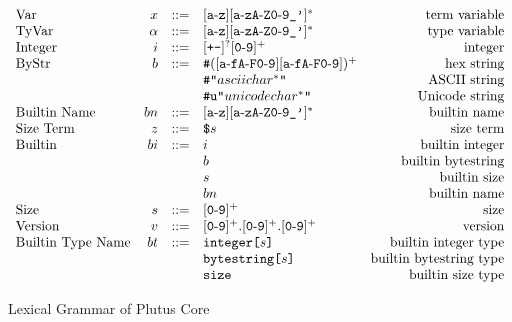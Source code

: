 \documentclass[../main.tex]{subfiles}
\begin{document}
\begin{figure*}[t]
    \centering
    \[\begin{array}{lrclr}
        \textrm{Var}     & x  & ::= & [\texttt{a}\!\hyphen{}\!\texttt{z}][\texttt{a}\!\hyphen{}\!\texttt{zA}\!\hyphen{}\!\texttt{Z0}\!\hyphen{}\!\texttt{9\_'}]^*                                                           & \textrm{term variable}\\
        \textrm{TyVar}   & \alpha & ::= & [\texttt{a}\!\hyphen{}\!\texttt{z}][\texttt{a}\!\hyphen{}\!\texttt{zA}\!\hyphen{}\!\texttt{Z0}\!\hyphen{}\!\texttt{9\_'}]^*                                                      & \textrm{type variable}\\
        \textrm{Integer} & i  & ::= & [\texttt{+-}]^?[\texttt{0}\!\hyphen{}\!\texttt{9}]^+                                                                                                                                  & \textrm{integer}\\
        \textrm{ByStr}   & b  & ::= & \texttt{\#}([\texttt{a}\!\hyphen{}\!\texttt{fA}\!\hyphen{}\!\texttt{F0}\!\hyphen{}\!\texttt{9}][\texttt{a}\!\hyphen{}\!\texttt{fA}\!\hyphen{}\!\texttt{F0}\!\hyphen{}\!\texttt{9}])^+ & \textrm{hex string}\\
                         &    &     & \texttt{\#"}asciichar^*\texttt{"}   & \textrm{ASCII string}\\
                         &    &     & \texttt{\#u"}unicodechar^*\texttt{"}    & \textrm{Unicode string}\\
        \textrm{Builtin Name}    & bn  & ::= & [\texttt{a}\!\hyphen{}\!\texttt{z}][\texttt{a}\!\hyphen{}\!\texttt{zA}\!\hyphen{}\!\texttt{Z0}\!\hyphen{}\!\texttt{9\_'}]^*                                                          & \textrm{builtin name}\\
        \textrm{Size Term} & z  & ::= & \texttt{\$} s & \textrm{size term}\\
        \textrm{Builtin} & bi & ::= & i & \textrm{builtin integer}\\
                         &    &     & b & \textrm{builtin bytestring}\\
                         &    &     & s & \textrm{builtin size}\\
                         &    &     & bn & \textrm{builtin name}\\
        \textrm{Size} & s  & ::= & [\texttt{0}\!\hyphen{}\!\texttt{9}]^+ & \textrm{size}\\
        \textrm{Version} & v & ::= & [\texttt{0}\!\hyphen{}\!\texttt{9}]^+.[\texttt{0}\!\hyphen{}\!\texttt{9}]^+.[\texttt{0}\!\hyphen{}\!\texttt{9}]^+ & \textrm{version}\\
        \textrm{Builtin Type Name}    & bt  & ::= & \builtinIntegerType{s} & \textrm{builtin integer type}\\
                                      &     &     & \builtinBytestringType{s} & \textrm{builtin bytestring type}\\
                                      &     &     & \builtinSizeType{} & \textrm{builtin size type}\\
    \end{array}\]
    \caption{Lexical Grammar of Plutus Core}
    \label{fig:Plutus_core_lexical_grammar}
\end{figure*}
\end{document}
